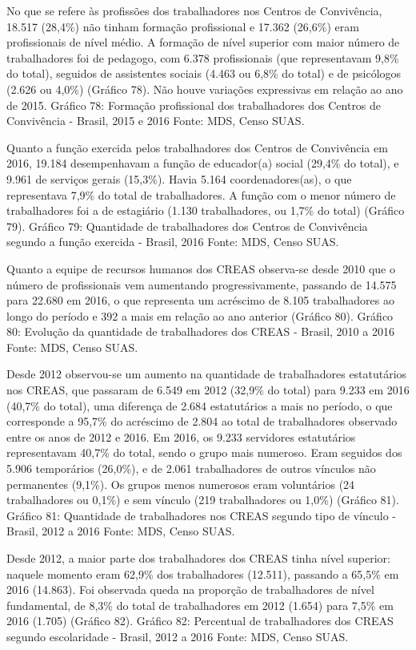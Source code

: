 \documentclass[
  brazilian]{report}
\begin{document}
No que se refere às profissões dos trabalhadores nos Centros de
Convivência, 18.517 (28,4\%) não tinham formação profissional e 17.362
(26,6\%) eram profissionais de nível médio. A formação de nível superior
com maior número de trabalhadores foi de pedagogo, com 6.378
profissionais (que representavam 9,8\% do total), seguidos de
assistentes sociais (4.463 ou 6,8\% do total) e de psicólogos (2.626 ou
4,0\%) (Gráfico 78). Não houve variações expressivas em relação ao ano
de 2015. Gráfico 78: Formação profissional dos trabalhadores dos Centros
de Convivência - Brasil, 2015 e 2016 Fonte: MDS, Censo SUAS.

Quanto a função exercida pelos trabalhadores dos Centros de Convivência
em 2016, 19.184 desempenhavam a função de educador(a) social (29,4\% do
total), e 9.961 de serviços gerais (15,3\%). Havia 5.164
coordenadores(as), o que representava 7,9\% do total de trabalhadores. A
função com o menor número de trabalhadores foi a de estagiário (1.130
trabalhadores, ou 1,7\% do total) (Gráfico 79). Gráfico 79: Quantidade
de trabalhadores dos Centros de Convivência segundo a função exercida -
Brasil, 2016 Fonte: MDS, Censo SUAS.

Quanto a equipe de recursos humanos dos CREAS observa-se desde 2010 que
o número de profissionais vem aumentando progressivamente, passando de
14.575 para 22.680 em 2016, o que representa um acréscimo de 8.105
trabalhadores ao longo do período e 392 a mais em relação ao ano
anterior (Gráfico 80). Gráfico 80: Evolução da quantidade de
trabalhadores dos CREAS - Brasil, 2010 a 2016 Fonte: MDS, Censo SUAS.

Desde 2012 observou-se um aumento na quantidade de trabalhadores
estatutários nos CREAS, que passaram de 6.549 em 2012 (32,9\% do total)
para 9.233 em 2016 (40,7\% do total), uma diferença de 2.684
estatutários a mais no período, o que corresponde a 95,7\% do acréscimo
de 2.804 ao total de trabalhadores observado entre os anos de 2012 e
2016. Em 2016, os 9.233 servidores estatutários representavam 40,7\% do
total, sendo o grupo mais numeroso. Eram seguidos dos 5.906 temporários
(26,0\%), e de 2.061 trabalhadores de outros vínculos não permanentes
(9,1\%). Os grupos menos numerosos eram voluntários (24 trabalhadores ou
0,1\%) e sem vínculo (219 trabalhadores ou 1,0\%) (Gráfico 81). Gráfico
81: Quantidade de trabalhadores nos CREAS segundo tipo de vínculo -
Brasil, 2012 a 2016 Fonte: MDS, Censo SUAS.

Desde 2012, a maior parte dos trabalhadores dos CREAS tinha nível
superior: naquele momento eram 62,9\% dos trabalhadores (12.511),
passando a 65,5\% em 2016 (14.863). Foi observada queda na proporção de
trabalhadores de nível fundamental, de 8,3\% do total de trabalhadores
em 2012 (1.654) para 7,5\% em 2016 (1.705) (Gráfico 82). Gráfico 82:
Percentual de trabalhadores dos CREAS segundo escolaridade - Brasil,
2012 a 2016 Fonte: MDS, Censo SUAS.
\end{document}
